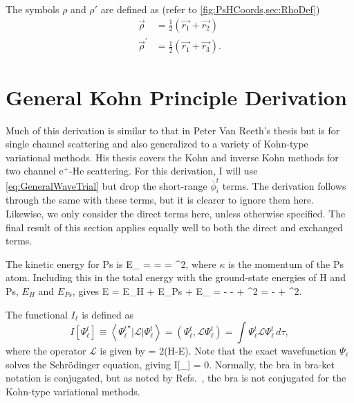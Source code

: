 \documentclass[Dissertation.tex]{subfiles}
\begin{document}
The symbols $\rho$ and $\rho'$ are defined as (refer to \cref{fig:PsHCoords,sec:RhoDef})
\begin{subequations}
\begin{align}
\vec{\rho} &= \frac{1}{2}\left(\vec{r_1} + \vec{r_2}\right) \label{eq:RhoDef}\\
\vec{\rho}^\prime &= \frac{1}{2}\left(\vec{r_1} + \vec{r_3}\right) \label{eq:RhopDef}.
\end{align}
\end{subequations}


\section{General Kohn Principle Derivation}
\label{sec:KohnDerivation}

Much of this derivation is similar to that in Peter Van Reeth's thesis \cite{
VanReethThesis} but is for single channel scattering and also generalized to 
a variety of Kohn-type variational methods. His thesis covers the Kohn and inverse 
Kohn methods for two channel e$^+$-He scattering. For this derivation, I will 
use \cref{eq:GeneralWaveTrial} but drop the short-range $\bar{\phi}_i^t$ 
terms. The derivation follows through the same with these terms, but it is 
clearer to ignore them here. Likewise, we only consider the direct terms 
here, unless otherwise specified. The final result of this section applies 
equally well to both the direct and exchanged terms.

The kinetic energy for Ps is
\beq
E_{\bm \kappa} =  =  =  \kappa^2,
\label{eq:Wavenumber}
\eeq
where $\kappa$ is the momentum of the Ps atom.
Including this in the total energy with the ground-state energies of H and Ps, $E_H$ and $E_{Ps}$, gives
\beq
\label{eq:TotalEnergy}
E = E_H + E_{Ps} + E_{\bm \kappa} = - -  +  \kappa^2 = - +  \kappa^2.
\eeq

The functional $I_\ell$ is defined as \cite{Adhikari1998}
\begin{equation}
I[\Psi_\ell^t]\equiv \left<{\Psi_\ell^t}^\star | \mathcal{L} | \Psi_\ell^t \right> = \left(\Psi_\ell^t, \mathcal{L} \Psi_\ell^t \right) = \int \Psi_\ell^t \mathcal{L}
  \Psi_\ell^t \,d\tau,
\label{eq:IlDefPsi}
\end{equation}
where the operator $\mathcal{L}$ is given by
\beq
\label{eq:LDef}
 = 2(H-E).
\eeq
Note that the exact wavefunction $\Psi_\ell$ solves the Schr\"{o}dinger equation, giving
\beq
\label{eq:Il0}
I[\Psi_\ell] = 0.
\eeq
\label{BraNote}Normally, the bra in bra-ket notation is conjugated,
but as noted by Refs.~\cite{Cooper2010,Lucchese1989,Zhang1988},
the bra is not conjugated for the Kohn-type variational methods.
\end{document}
